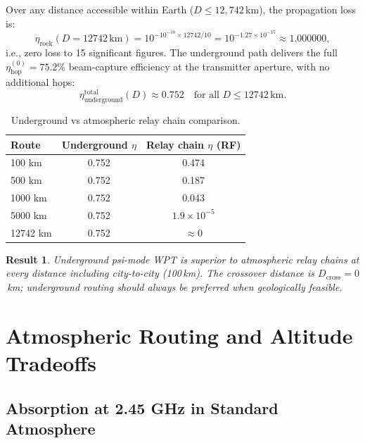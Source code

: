 \documentclass[aps,prd,twocolumn,superscriptaddress]{revtex4-2}
\newcommand{\etahop}{\eta_\mathrm{hop}}
\newtheorem{result}{Result}
\begin{document}
Over any distance accessible within Earth ($D \leq 12{,}742$\,km),
the propagation loss is:
\begin{equation}
\eta_\mathrm{rock}(D=12742\,\mathrm{km})
= 10^{-10^{-18}\times12742/10}
= 10^{-1.27\times10^{-15}}
\approx 1.000000,
\label{eq:rock_global}
\end{equation}
i.e., zero loss to 15 significant figures.  The underground path delivers
the full $\etahop^{(0)} = 75.2\%$ beam-capture efficiency at the
transmitter aperture, with no additional hops:
\begin{equation}
\eta_\mathrm{underground}^\mathrm{total}(D) \approx 0.752
\quad\text{for all } D \leq 12742\,\mathrm{km}.
\label{eq:eta_underground}
\end{equation}

\begin{table}[H]
\centering
\caption{Underground vs atmospheric relay chain comparison.}
\label{tab:compare}
\begin{tabular}{lcc}
\toprule
Route & Underground $\eta$ & Relay chain $\eta$ (RF) \\
\midrule
100 km   & 0.752 & 0.474 \\
500 km   & 0.752 & 0.187 \\
1000 km  & 0.752 & 0.043 \\
5000 km  & 0.752 & $1.9\times10^{-5}$ \\
12742 km & 0.752 & $\approx 0$ \\
\bottomrule
\end{tabular}
\end{table}

\begin{result}
Underground psi-mode WPT is superior to atmospheric relay chains
at every distance including city-to-city (100\,km).
The crossover distance is $D_\mathrm{cross} = 0$\,km;
underground routing should always be preferred when geologically
feasible.
\end{result}

\section{Atmospheric Routing and Altitude Tradeoffs}
\label{sec:atm}

\subsection{Absorption at 2.45 GHz in Standard Atmosphere}
\end{document}
